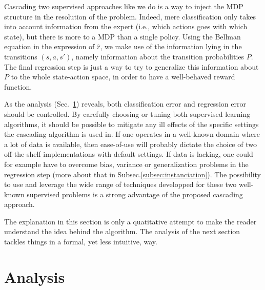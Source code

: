 \documentclass[smallextended]{svjour3}
\begin{document}
Cascading two supervised approaches like we do is a way to inject the MDP structure in the resolution of the problem. Indeed, mere classification only takes into account information from the expert (i.e., which actions goes with which state), but there is more to a MDP than a single policy. Using the Bellman equation in the expression of $\hat r$, we make use of the information lying in the transitions $(s,a,s')$, namely information about the transition probabilities $P$. The final regression step is just a way to try to generalize this information about $P$ to the whole state-action space, in order to have a well-behaved reward function.

As the analysis (Sec.~\ref{sec:analysis}) reveals, both classification error and regression error should be controlled. By carefully choosing or tuning both supervised learning algorithms, it should be possible to mitigate any ill effects of the specific settings the cascading algorithm is used in. If one operates in a well-known domain where a lot of data is available, then ease-of-use will probably dictate the choice of two off-the-shelf implementations with default settings. If data is lacking, one could for example have to overcome bias, variance or generalization problems in the regression step (more about that in Subsec.\ref{subsec:instanciation}). The possibility to use and leverage the wide range of techniques developped for these two well-known supervised problems is a strong advantage of the proposed cascading approach.

The explanation in this section is only a quatitative attempt to make the reader understand the idea behind the algorithm. The analysis of the next section tackles things in a formal, yet less intuitive, way.

\section{Analysis}
\label{sec:analysis}


\end{document}
